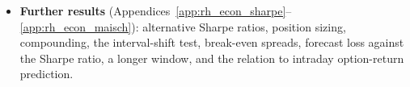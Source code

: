 \begin{itemize}
\item \textbf{Further results} (Appendices~\ref{app:rh_econ_sharpe}--\ref{app:rh_econ_maisch}): alternative Sharpe
  ratios, position sizing, compounding, the interval-shift test, break-even spreads, forecast loss against the Sharpe
  ratio, a longer window, and the relation to intraday option-return prediction.
\end{itemize}

